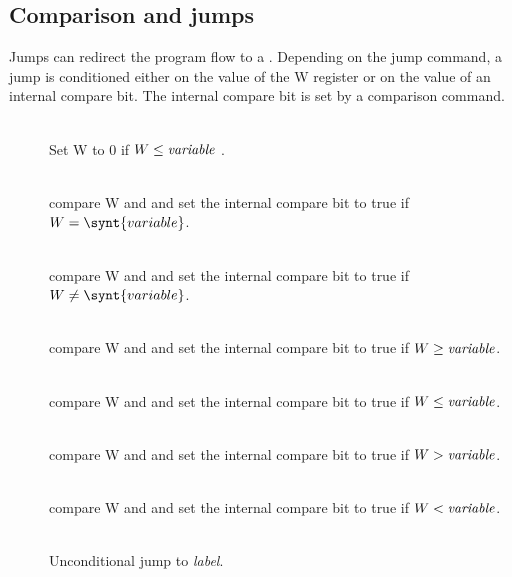 \documentclass[11pt]{scrartcl}
\begin{document}
\subsection{Comparison and jumps}
Jumps can redirect the program flow to a . Depending on the jump command, a jump is conditioned either on the value of the W register or on the value of an internal compare bit. The internal compare bit is set by a comparison command.

\begin{addmargin}{1cm}
\begin{description}
\item[ ]  \hfill\\  
Set W to 0 if $W \le \text{{\it variable}}$ .

\item[ ]  \hfill\\  
compare W and  and set the internal compare bit to true if $W=\synt{variable}$.

\item[ ]  \hfill\\  
compare W and  and set the internal compare bit to true if $W\neq\synt{variable}$.

\item[ ]\hfill\\  
compare W and  and set the internal compare bit to true if $W \ge \text{\it variable}$.

\item[ ]\hfill\\  
compare W and  and set the internal compare bit to true if $W \le \text{\it variable}$.

\item[ ]\hfill\\  
compare W and  and set the internal compare bit to true if $W > \text{\it variable}$.

\item[ ]\hfill\\  
compare W and  and set the internal compare bit to true if $W < \text{\it variable}$.

\item[ ] \hfill\\   
Unconditional jump to {\it label}.


\end{description}
\end{addmargin}
\end{document}
